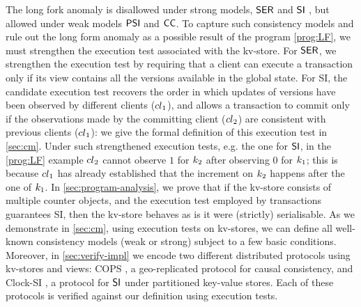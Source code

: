 The long fork anomaly is disallowed under strong models, \eg \(\mathsf{SER}\) and 
\(\mathsf{SI}\) \cite{fekete-tods}, 
but allowed under weak models \eg \(\mathsf{PSI}\) \cite{PSI} and \(\mathsf{CC}\). 
To capture such consistency models and rule out the long form anomaly as a possible result 
of the program \eqref{prog:LF}, we must strengthen the execution test associated with the kv-store. 
For \(\mathsf{SER}\), we strengthen the execution test by requiring that a client can execute a transaction 
only if its view contains all the versions available in the global state. 
For SI, 
the candidate execution test recovers the order in which 
updates of versions have been observed by different clients (\eg ${cl}_1$), 
and allows a transaction to commit only if the observations made by the committing client (\eg ${cl}_2$) 
are consistent with previous clients (\ie ${cl}_1$): we give the formal definition of this execution test 
in \cref{sec:cm}.
Under such strengthened execution tests, e.g. the one for \(\mathsf{SI}\), in the \eqref{prog:LF} example ${cl}_2$ cannot
observe $1$ for $k_2$ after observing $0$ for $k_1$; 
this is because ${cl}_1$ has already established that the increment on $k_2$ happens after 
the one of $k_1$. 
In \cref{sec:program-analysis}, we prove that if the kv-store consists of multiple counter objects, and the execution test employed by transactions guarantees SI, then the kv-store 
behaves as is it were (strictly) serialisable.
As we demonstrate in \cref{sec:cm}, using execution tests on kv-stores, we can define all well-known consistency models (weak or strong) subject to a few basic conditions. 
Moreover, in \cref{sec:verify-impl} we encode two different distributed protocols using kv-stores and views: COPS \cite{cops}, 
a geo-replicated protocol for causal consistency, and Clock-SI \cite{clocksi}, a protocol for \(\mathsf{SI}\) under partitioned key-value stores.
Each of these protocols is verified against our definition using execution tests.
